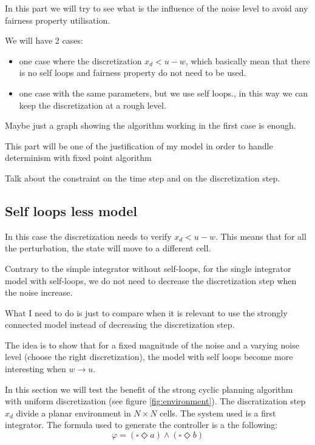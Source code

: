\documentclass{article}
\begin{document}
In this part we will try to see what is the influence of the noise level to avoid any fairness property utilisation.

We will have 2 cases:
\begin{itemize}[noitemsep,topsep=0pt,parsep=0pt,partopsep=0pt]
\item one case where the discretization $x_d<u-w$, which basically mean that there is no self loops and fairness property do not need to be used.
\item one case  with the same parameters, but we use self loops., in this way we can keep the discretization at a rough level.
\end{itemize}

Maybe just a graph showing the algorithm working in the first case is enough. 

This part will be one of the justification of my model in order to handle determinism with fixed point algorithm

Talk about the constraint on the time step and on the discretization step.

\subsection{Self loops less model}

In this case the discretization needs to verify $x_d<u-w$.
This means that for all the perturbation, the state will move to a different cell.

Contrary to the simple integrator without self-loops, for the single integrator model with self-loops, we do not need to decrease the discretization step when the noise increase.

What I need to do is just to compare when it is relevant to use the strongly connected model instead of decreasing the discretization step.

The idea is to show that for a fixed magnitude of the noise and a varying noise level (choose the right discretization), the model with self loops become more interesting when $w \rightarrow u$.


In this section we will test the benefit of the strong cyclic planning algorithm with uniform discretization (see figure \ref{fig:environment}).
The discratization step $x_d$ divide a planar environment in $N \times N$ cells. The system used is a first integrator.
The formula used to generate the controller is a the following:
$$\varphi = (\square \Diamond a) \wedge (\square \Diamond b)$$
\end{document}
